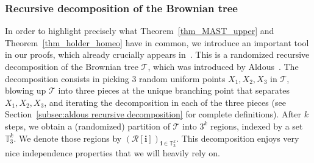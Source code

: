 \documentclass[JEP,XML,SOM,Unicode,NoFloatCountersInSection,published]{cedram}
\newcommand{\Tt}{\mathcal{T}}
\newcommand{\Rr}{\mathcal{R}}
\newcommand{\ii}{\mathbf{i}}
\theoremstyle{plain}
\theoremstyle{definition}
\begin{document}
\subsubsection*{Recursive decomposition of the Brownian tree}
In order to highlight precisely what Theorem~\ref{thm_MAST_upper} and Theorem~\ref{thm_holder_homeo} have in common, we introduce an important tool in our proofs, which already crucially appears in~\cite{aldous_largest_2022}.
This is a randomized recursive decomposition of the Brownian tree $\Tt$, which was introduced by Aldous~\cite{aldous_recursive_1994}.
The decomposition consists in picking $3$ random uniform points $X_1, X_2, X_3$ in $\Tt$, blowing up $\Tt$ into three pieces at the unique branching point that separates $X_1, X_2, X_3$, and iterating the decomposition in each of the three pieces (see Section~\ref{subsec:aldous recursive decomposition} for complete definitions).
After $k$ steps, we obtain a (randomized) partition of $\Tt$ into $3^k$ regions, indexed by a set $\mathbb{T}_3^k$.
We denote those regions by $\left( \Rr[\ii] \right)_{\ii \in \mathbb{T}_3^k}$.
This decomposition enjoys very nice independence properties that we will heavily rely on.
\end{document}
